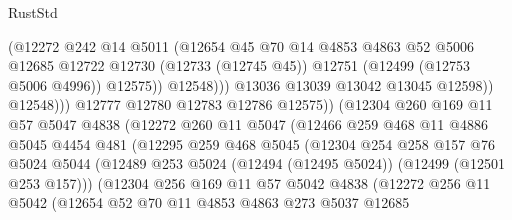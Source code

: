 \begin{lexlean}{RustStd}
\begin{coremodule}
{\begin{coremodule}
{{{{{{{{{{{{{{{{{{{{{{{{{{{{{{{{{{{{{{{{{{{{{{{{{{{{{{{{{{{{{{{{{{{{{{{{{{{{{{{{                                (@12272
                                  @242
                                  @14
                                  @5011
                                  (@12654
                                    @45
                                    @70
                                    @14
                                    @4853
                                    @4863
                                    @52
                                    @5006
                                    @12685
                                    @12722
                                    @12730
                                    (@12733 (@12745 @45))
                                    @12751
                                    (@12499 (@12753 @5006 @4996))
                                    @12575))
                                @12548)))
                          @13036
                          @13039
                          @13042
                          @13045
                          @12598))
                      @12548)))
                @12777
                @12780
                @12783
                @12786
                @12575))
            (@12304
              @260
              @169
              @11
              @57
              @5047
              @4838
              (@12272
                @260
                @11
                @5047
                (@12466
                  @259
                  @468
                  @11
                  @4886
                  @5045
                  @4454
                  @481
                  (@12295
                    @259
                    @468
                    @5045
                    (@12304
                      @254
                      @258
                      @157
                      @76
                      @5024
                      @5044
                      (@12489 @253 @5024 (@12494 (@12495 @5024)) (@12499 (@12501 @253 @157)))
                      (@12304
                        @256
                        @169
                        @11
                        @57
                        @5042
                        @4838
                        (@12272
                          @256
                          @11
                          @5042
                          (@12654
                            @52
                            @70
                            @11
                            @4853
                            @4863
                            @273
                            @5037
                            @12685
}}}}}}}}}}}}}}}}}}}}}}}}}}}}}}}}}}}}}}}}}}}}}}}}}}}}}}}}}}}}}}}}}}}}}}}}}}}}}}}}
\end{coremodule}}
\end{coremodule}
\end{lexlean}
